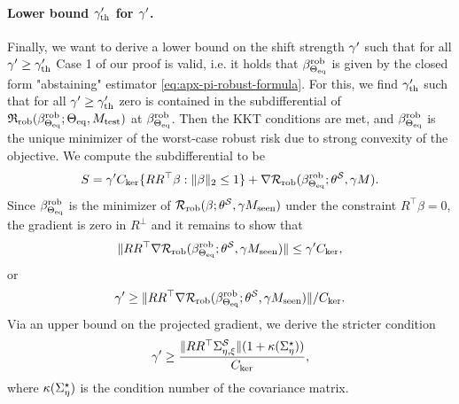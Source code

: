 \paragraph{Lower bound $\gamma'_{\mathrm{th}}$ for $\gamma'$.}
Finally, we want to derive a lower bound on the shift strength  $\gamma'$ such that for all $\gamma' \geq \gamma'_{\mathrm{th}}$ Case 1 of our proof is valid, i.e. it holds that $\beta^{\mathrm{rob}}_{\Theta_{\mathrm{eq}}}$ is given by the closed form "abstaining" estimator \eqref{eq:apx-pi-robust-formula}. For this, we find $\gamma'_{\mathrm{th}}$ such that for all $\gamma' \geq \gamma'_{\mathrm{th}}$ zero is contained in the subdifferential of$\mathfrak{R}_{\mathrm{rob}}(\beta^{\mathrm{rob}}_{\Theta_{\mathrm{eq}}};\Theta_{\mathrm{eq}},M_{\mathrm{test}})$ at $\beta^{\mathrm{rob}}_{\Theta_{\mathrm{eq}}}$. Then the KKT conditions are met, and $\beta^{\mathrm{rob}}_{\Theta_{\mathrm{eq}}}$ is the unique minimizer of the worst-case robust risk due to strong convexity of the objective. We compute the subdifferential to be
\begin{align*}
    S = \gamma' C_{\mathrm{ker}} \{ R R^\top \beta: \| \beta \|_2 \leq 1 \} + \nabla \mathcal{R}_{\mathrm{rob}}(\beta^{\mathrm{rob}}_{\Theta_{\mathrm{eq}}}; \theta^{\mathcal{S}}, \gamma M).
\end{align*}
Since $\beta^{\mathrm{rob}}_{\Theta_{\mathrm{eq}}}$ is the minimizer of $ \mathcal{R}_{\mathrm{rob}}(\beta; \theta^{\mathcal{S}}, \gamma M_{\mathrm{seen}})$ under the constraint $R^\top \beta = 0$, the gradient is zero in $R^\perp$ and it remains to show that 
\begin{align*}
    \| R R^\top \nabla \mathcal{R}_{\mathrm{rob}}(\beta^{\mathrm{rob}}_{\Theta_{\mathrm{eq}}}; \theta^{\mathcal{S}}, \gamma M_{\mathrm{seen}}) \| \leq \gamma' C_{\mathrm{ker}},
\end{align*}
or 
\begin{align*}
    \gamma' \geq \| R R^\top \nabla \mathcal{R}_{\mathrm{rob}}(\beta^{\mathrm{rob}}_{\Theta_{\mathrm{eq}}}; \theta^{\mathcal{S}}, \gamma M_{\mathrm{seen}}) \| / C_{\mathrm{ker}}. 
\end{align*}
Via an upper bound on the projected gradient, we derive the stricter condition
\begin{align*}
    \gamma' \geq \frac{\| R R^\top \Sigma^{\mathcal{S}}_{\eta,\xi}\| (1 + \kappa(\Sigma^\star_{\eta})) }{C_{\mathrm{ker}}},
\end{align*}
where $\kappa(\Sigma^\star_{\eta})$ is the condition number of the covariance matrix. 


